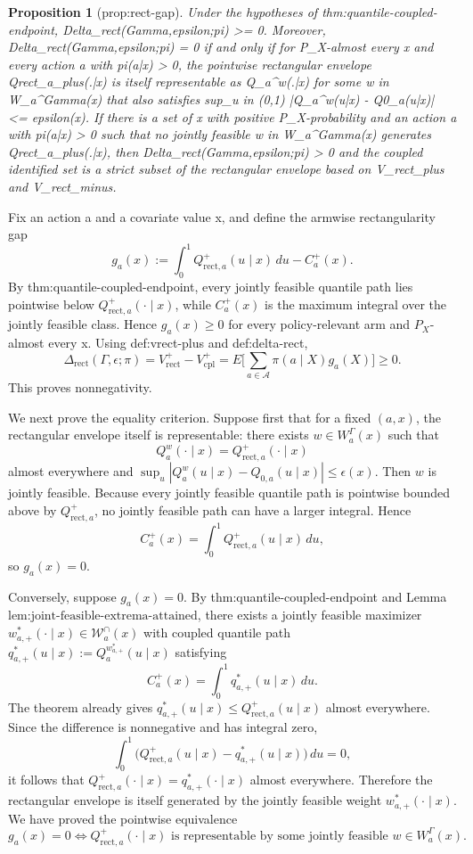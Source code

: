 \documentclass{article}
\newtheorem{proposition}{Proposition}
\begin{document}
\begin{proposition}[prop:rect-gap]\label{prop:rect-gap}
Under the hypotheses of thm:quantile-coupled-endpoint, Delta_rect(Gamma,epsilon;pi) >= 0. Moreover, Delta_rect(Gamma,epsilon;pi) = 0 if and only if for P_X-almost every x and every action a with pi(a|x) > 0, the pointwise rectangular envelope Qrect_a_plus(.|x) is itself representable as Q_a^w(.|x) for some w in W_a^Gamma(x) that also satisfies sup_{u in (0,1)} |Q_a^w(u|x) - Q0_a(u|x)| <= epsilon(x). If there is a set of x with positive P_X-probability and an action a with pi(a|x) > 0 such that no jointly feasible w in W_a^Gamma(x) generates Qrect_a_plus(.|x), then Delta_rect(Gamma,epsilon;pi) > 0 and the coupled identified set is a strict subset of the rectangular envelope based on V_rect_plus and V_rect_minus.
\end{proposition}
Fix an action a and a covariate value x, and define the armwise rectangularity gap
\[
g_a(x):=\int_0^1 Q_{\mathrm{rect},a}^+(u\mid x)\,du-C_a^+(x).
\]
By thm:quantile-coupled-endpoint, every jointly feasible quantile path lies pointwise below \(Q_{\mathrm{rect},a}^+(\cdot\mid x)\), while \(C_a^+(x)\) is the maximum integral over the jointly feasible class. Hence \(g_a(x)\ge 0\) for every policy-relevant arm and \(P_X\)-almost every x. Using def:vrect-plus and def:delta-rect,
\[
\Delta_{\mathrm{rect}}(\Gamma,\epsilon;\pi)=V_{\mathrm{rect}}^+-V_{\mathrm{cpl}}^+=E\Big[\sum_{a\in\mathcal A}\pi(a\mid X)g_a(X)\Big]\ge 0.
\]
This proves nonnegativity.

We next prove the equality criterion. Suppose first that for a fixed \((a,x)\), the rectangular envelope itself is representable: there exists \(w\in W_a^{\Gamma}(x)\) such that
\[
Q_a^w(\cdot\mid x)=Q_{\mathrm{rect},a}^+(\cdot\mid x)
\]
almost everywhere and \(\sup_u |Q_a^w(u\mid x)-Q_{0,a}(u\mid x)|\le \epsilon(x)\). Then \(w\) is jointly feasible. Because every jointly feasible quantile path is pointwise bounded above by \(Q_{\mathrm{rect},a}^+\), no jointly feasible path can have a larger integral. Hence
\[
C_a^+(x)=\int_0^1 Q_{\mathrm{rect},a}^+(u\mid x)\,du,
\]
so \(g_a(x)=0\).

Conversely, suppose \(g_a(x)=0\). By thm:quantile-coupled-endpoint and Lemma \(\text{lem:joint-feasible-extrema-attained}\), there exists a jointly feasible maximizer \(w_{a,+}^*(\cdot\mid x)\in\mathcal W_a^{\cap}(x)\) with coupled quantile path \(q_{a,+}^*(u\mid x):=Q_a^{w_{a,+}^*}(u\mid x)\) satisfying
\[
C_a^+(x)=\int_0^1 q_{a,+}^*(u\mid x)\,du.
\]
The theorem already gives \(q_{a,+}^*(u\mid x)\le Q_{\mathrm{rect},a}^+(u\mid x)\) almost everywhere. Since the difference is nonnegative and has integral zero,
\[
\int_0^1 \big(Q_{\mathrm{rect},a}^+(u\mid x)-q_{a,+}^*(u\mid x)\big)\,du=0,
\]
it follows that \(Q_{\mathrm{rect},a}^+(\cdot\mid x)=q_{a,+}^*(\cdot\mid x)\) almost everywhere. Therefore the rectangular envelope is itself generated by the jointly feasible weight \(w_{a,+}^*(\cdot\mid x)\). We have proved the pointwise equivalence
\[
g_a(x)=0 \iff Q_{\mathrm{rect},a}^+(\cdot\mid x)\text{ is representable by some jointly feasible }w\in W_a^{\Gamma}(x).
\]
\end{document}

